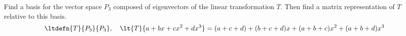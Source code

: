 Find a basis for the vector space $P_3$  composed of eigenvectors of the linear transformation $T$.  Then find a matrix representation of $T$ relative to this basis.
%
\begin{equation*}
\ltdefn{T}{P_3}{P_3},\quad\lt{T}{a+bx+cx^2+dx^3}=
(a+c+d)+(b+c+d)x+(a+b+c)x^2+(a+b+d)x^3
\end{equation*}